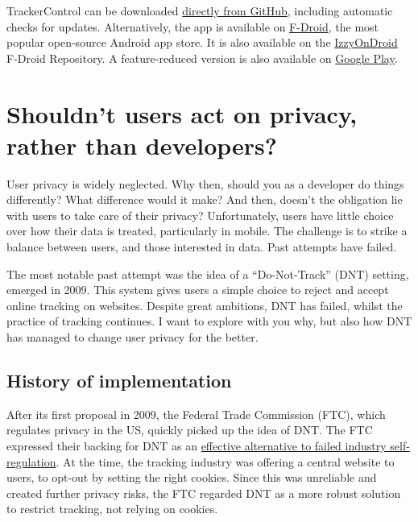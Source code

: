 \documentclass[
]{book}
\begin{document}
TrackerControl can be downloaded \href{https://github.com/OxfordHCC/tracker-control-android/releases}{directly from GitHub}, including automatic checks for updates. Alternatively, the app is available on \href{https://f-droid.org/packages/net.kollnig.missioncontrol.fdroid}{F-Droid}, the most popular open-source Android app store. It is also available on the \href{https://apt.izzysoft.de/fdroid/index/apk/net.kollnig.missioncontrol}{IzzyOnDroid} F-Droid Repository. A feature-reduced version is also available on \href{https://play.google.com/store/apps/details?id=net.kollnig.missioncontrol.play}{Google Play}.

\hypertarget{shouldnt-users-act-on-privacy-rather-than-developers}{%
\section{Shouldn't users act on privacy, rather than developers?}\label{shouldnt-users-act-on-privacy-rather-than-developers}}

User privacy is widely neglected. Why then, should you as a developer do things differently? What difference would it make? And then, doesn't the obligation lie with users to take care of their privacy? Unfortunately, users have little choice over how their data is treated, particularly in mobile. The challenge is to strike a balance between users, and those interested in data. Past attempts have failed.

The most notable past attempt was the idea of a ``Do-Not-Track'' (DNT) setting, emerged in 2009. This system gives users a simple choice to reject and accept online tracking on websites. Despite great ambitions, DNT has failed, whilst the practice of tracking continues. I want to explore with you why, but also how DNT has managed to change user privacy for the better.

\hypertarget{history-of-implementation}{%
\subsection{History of implementation}\label{history-of-implementation}}

After its first proposal in 2009, the Federal Trade Commission (FTC), which regulates privacy in the US, quickly picked up the idea of DNT. The FTC expressed their backing for DNT as an \href{https://www.wired.com/2010/12/ftc-do-not-track/}{effective alternative to failed industry self-regulation}. At the time, the tracking industry was offering a central website to users, to opt-out by setting the right cookies. Since this was unreliable and created further privacy risks, the FTC regarded DNT as a more robust solution to restrict tracking, not relying on cookies.
\end{document}
